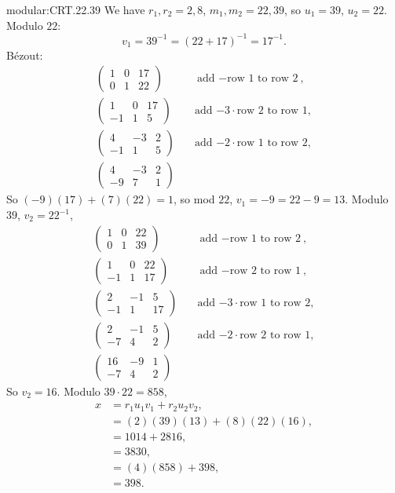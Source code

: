 \begin{answer}{modular:CRT.22.39}
We have \(r_1,r_2=2,8\), \(m_1,m_2=22,39\), so \(u_1=39\), \(u_2=22\).
Modulo \(22\):
\[
v_1=39^{-1}=(22+17)^{-1}=17^{-1}.
\]
B\'ezout:
\begin{align*}
\begin{pmatrix}
1&0&17\\
0&1&22
\end{pmatrix}
&\quad\text{add \(-\)row 1 to row 2},\\
\begin{pmatrix}
1&0&17\\
-1&1&5
\end{pmatrix}
&\quad\text{add \(-3\cdot\)row 2 to row 1},\\
\begin{pmatrix}
4&-3&2\\
-1&1&5
\end{pmatrix}
&\quad\text{add \(-2\cdot\)row 1 to row 2},\\
\begin{pmatrix}
4&-3&2\\
-9&7&1
\end{pmatrix}
\end{align*}
So \((-9)(17)+(7)(22)=1\), so mod \(22\), \(v_1=-9=22-9=13\).
Modulo \(39\), \(v_2=22^{-1}\), 
\begin{align*}
\begin{pmatrix}
1&0&22\\
0&1&39
\end{pmatrix}
&\quad\text{add \(-\)row 1 to row 2},\\
\begin{pmatrix}
1&0&22\\
-1&1&17
\end{pmatrix}
&\quad\text{add \(-\)row 2 to row 1},\\
\begin{pmatrix}
2&-1&5\\
-1&1&17
\end{pmatrix}
&\quad\text{add \(-3\cdot\)row 1 to row 2},\\
\begin{pmatrix}
2&-1&5\\
-7&4&2
\end{pmatrix}
&\quad\text{add \(-2\cdot\)row 2 to row 1},\\
\begin{pmatrix}
16&-9&1\\
-7&4&2
\end{pmatrix}
\end{align*}
So \(v_2=16\).
Modulo \(39\cdot 22=858\), 
\begin{align*}
x&=r_1u_1v_1+r_2u_2v_2,\\
 &=(2)(39)(13)+(8)(22)(16),\\
 &=1014+2816,\\
 &=3830,\\
 &=(4)(858)+398,\\
 &=398.
\end{align*}
\end{answer}
